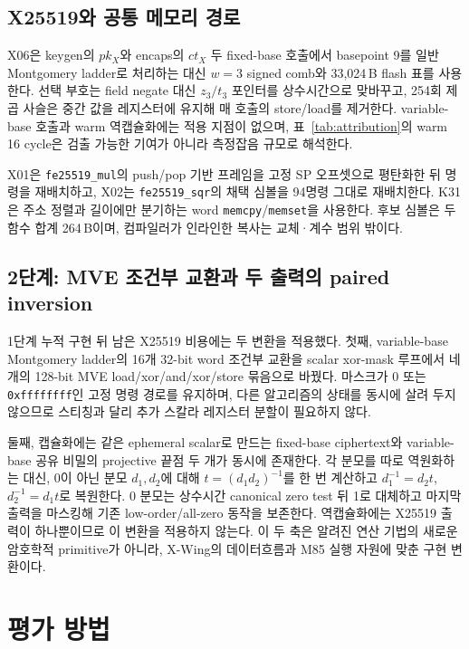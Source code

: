 \documentclass[runningheads,orivec]{llncs}
\newcommand{\xwing}{X-Wing}\newcommand{\slothy}{SLOTHY}\newcommand{\keccak}{Keccak-f[1600]}
\begin{document}
\subsection{X25519와 공통 메모리 경로}

X06은 keygen의 $pk_X$와 encaps의 $ct_X$ 두 fixed-base 호출에서 basepoint 9를 일반
Montgomery ladder로 처리하는 대신 $w=3$ signed comb와 33,024\,B flash 표를 사용한다.
선택 부호는 field negate 대신 $z_3/t_3$ 포인터를 상수시간으로 맞바꾸고, 254회 제곱
사슬은 중간 값을 레지스터에 유지해 매 호출의 store/load를 제거한다. variable-base
호출과 warm 역캡슐화에는 적용 지점이 없으며, 표~\ref{tab:attribution}의 warm 16 cycle은
검출 가능한 기여가 아니라 측정잡음 규모로 해석한다.

X01은 \texttt{fe25519\_mul}의 push/pop 기반 프레임을 고정 SP 오프셋으로 평탄화한 뒤
명령을 재배치하고, X02는 \texttt{fe25519\_sqr}의 채택 심볼을 94명령 그대로 재배치한다.
K31은 주소 정렬과 길이에만 분기하는 word \texttt{memcpy}/\texttt{memset}을 사용한다.
후보 심볼은 두 함수 합계 264\,B이며, 컴파일러가 인라인한 복사는 교체·계수 범위 밖이다.

\FloatBarrier
\subsection{2단계: MVE 조건부 교환과 두 출력의 paired inversion}

1단계 누적 구현 뒤 남은 X25519 비용에는 두 변환을 적용했다. 첫째, variable-base
Montgomery ladder의 16개 32-bit word 조건부 교환을 scalar xor-mask 루프에서 네 개의
128-bit MVE load/xor/and/xor/store 묶음으로 바꿨다. 마스크가 0 또는
\texttt{0xffffffff}인 고정 명령 경로를 유지하며, 다른 알고리즘의 상태를 동시에
살려 두지 않으므로 스티칭과 달리 추가 스칼라 레지스터 분할이 필요하지 않다.

둘째, 캡슐화에는 같은 ephemeral scalar로 만드는 fixed-base ciphertext와
variable-base 공유 비밀의 projective 끝점 두 개가 동시에 존재한다. 각 분모를 따로
역원화하는 대신, 0이 아닌 분모 $d_1,d_2$에 대해
$t=(d_1d_2)^{-1}$를 한 번 계산하고 $d_1^{-1}=d_2t$,
$d_2^{-1}=d_1t$로 복원한다. 0 분모는 상수시간 canonical zero test 뒤 1로 대체하고
마지막 출력을 마스킹해 기존 low-order/all-zero 동작을 보존한다. 역캡슐화에는 X25519
출력이 하나뿐이므로 이 변환을 적용하지 않는다. 이 두 축은 알려진 연산 기법의 새로운
암호학적 primitive가 아니라, \xwing{}의 데이터흐름과 M85 실행 자원에 맞춘 구현 변환이다.

\FloatBarrier
\section{평가 방법}\label{sec:methods}
\end{document}
